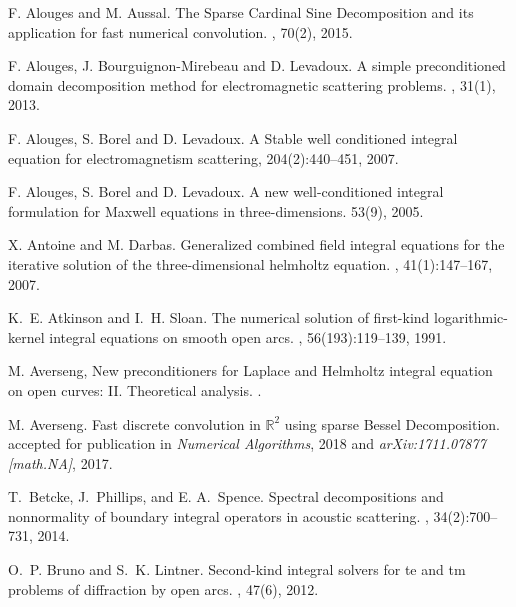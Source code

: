 \documentclass[a4paper]{article}
\begin{document}
\begin{thebibliography}{10}

F. Alouges and M. Aussal. \newblock The Sparse Cardinal Sine Decomposition and its application for fast numerical convolution. , 70(2), 2015.

F. Alouges, J. Bourguignon-Mirebeau and D. Levadoux. 
\newblock A simple preconditioned domain decomposition method for electromagnetic scattering problems. , 31(1), 2013.

F. Alouges, S. Borel and D. Levadoux. 
\newblock A Stable well conditioned integral equation for electromagnetism scattering,  204(2):440--451, 2007.

F. Alouges, S. Borel and D. Levadoux.
\newblock  A new well-conditioned integral formulation for Maxwell equations in three-dimensions. 
 53(9), 2005.

X. Antoine and M. Darbas.
\newblock Generalized combined field integral equations for the iterative
  solution of the three-dimensional helmholtz equation.
,
  41(1):147--167, 2007.

K.~E. Atkinson and I.~H. Sloan.
\newblock The numerical solution of first-kind logarithmic-kernel integral
  equations on smooth open arcs.
, 56(193):119--139, 1991.

M. Averseng,
\newblock New preconditioners for Laplace and  Helmholtz integral equation on open curves: II. Theoretical analysis.
.

M. Averseng. 
\newblock Fast discrete convolution in $\mathbb{R}^2$ using sparse Bessel Decomposition.
\newblock accepted for publication in {\em Numerical Algorithms}, 2018 and {\em arXiv:1711.07877 [math.NA]}, 2017.

T.~Betcke, J.~Phillips, and E. A.~Spence.
\newblock Spectral decompositions and nonnormality of boundary integral
  operators in acoustic scattering.
, 34(2):700--731, 2014.

O.~P. Bruno and S.~K. Lintner.
\newblock Second-kind integral solvers for te and tm problems of diffraction by
  open arcs.
, 47(6), 2012.


\end{thebibliography}
\end{document}
